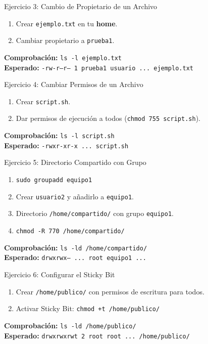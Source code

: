 \documentclass{beamer}
\begin{document}
\begin{frame}{Ejercicio 3: Cambio de Propietario de un Archivo}
    \begin{enumerate}
        \item Crear \texttt{ejemplo.txt} en tu \textbf{home}.
        \item Cambiar propietario a \texttt{prueba1}.
    \end{enumerate}
    \textbf{Comprobación:} \texttt{ls -l ejemplo.txt} \\
    \textbf{Esperado:} \texttt{-rw-r--r-- 1 prueba1 usuario ... ejemplo.txt}
\end{frame}

\begin{frame}{Ejercicio 4: Cambiar Permisos de un Archivo}
    \begin{enumerate}
        \item Crear \texttt{script.sh}.
        \item Dar permisos de ejecución a todos (\texttt{chmod 755 script.sh}).
    \end{enumerate}
    \textbf{Comprobación:} \texttt{ls -l script.sh} \\
    \textbf{Esperado:} \texttt{-rwxr-xr-x ... script.sh}
\end{frame}

\begin{frame}{Ejercicio 5: Directorio Compartido con Grupo}
    \begin{enumerate}
        \item \texttt{sudo groupadd equipo1}
        \item Crear \texttt{usuario2} y añadirlo a \texttt{equipo1}.
        \item Directorio \texttt{/home/compartido/} con grupo \texttt{equipo1}.
        \item \texttt{chmod -R 770 /home/compartido/}
    \end{enumerate}
    \textbf{Comprobación:} \texttt{ls -ld /home/compartido/} \\
    \textbf{Esperado:} \texttt{drwxrwx--- ... root equipo1 ...}
\end{frame}

\begin{frame}{Ejercicio 6: Configurar el Sticky Bit}
    \begin{enumerate}
        \item Crear \texttt{/home/publico/} con permisos de escritura para todos.
        \item Activar Sticky Bit: \texttt{chmod +t /home/publico/}
    \end{enumerate}
    \textbf{Comprobación:} \texttt{ls -ld /home/publico/} \\
    \textbf{Esperado:} \texttt{drwxrwxrwt 2 root root ... /home/publico/}
\end{frame}
\end{document}
